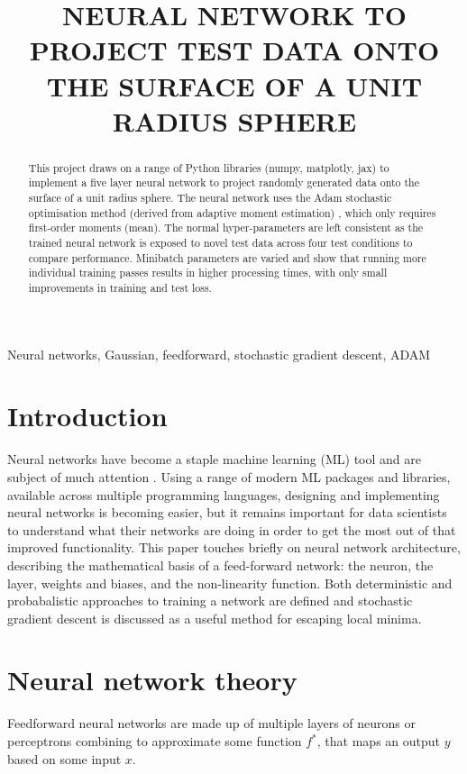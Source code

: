 \documentclass{article}
\title{NEURAL NETWORK TO PROJECT TEST DATA ONTO THE SURFACE OF A UNIT RADIUS SPHERE}
\begin{document}
%
%
\begin{abstract}
This project draws on a range of Python libraries (numpy, matplotly, jax) to implement a five layer neural network to project randomly generated data onto the surface of a unit radius sphere.  The neural network uses the Adam stochastic optimisation method (derived from adaptive moment estimation) \cite{KingmaBa2015}, which only requires first-order moments (mean).  The normal hyper-parameters are left consistent as the trained neural network is exposed to novel test data across four test conditions to compare performance.  Minibatch parameters are varied and show that running more individual training passes results in higher processing times, with only small improvements in training and test loss.
\end{abstract}
%
\begin{keywords}
Neural networks, Gaussian, feedforward, stochastic gradient descent, ADAM
\end{keywords}
%
\section{Introduction}
\label{sec:intro}

Neural networks have become a staple machine learning (ML) tool and are subject of much attention \cite{samek2021explaining}.  Using a range of modern ML packages and libraries, available across multiple programming languages, designing and implementing neural networks is becoming easier, but it remains important for data scientists to understand what their networks are doing in order to get the most out of that improved functionality.  This paper touches briefly on neural network architecture, describing the mathematical basis of a feed-forward network:  the neuron, the layer, weights and biases, and the non-linearity function.  Both deterministic and probabalistic approaches to training a network are defined and stochastic gradient descent is discussed as a useful method for escaping local minima.
%
%
\section{Neural network theory}
\label{sec:theory}

Feedforward neural networks are made up of multiple layers of neurons or perceptrons \cite{Goodfellow-et-al-2016} combining to approximate some function $f^*$, that maps an output $y$ based on some input $x$. 
%
\end{document}
